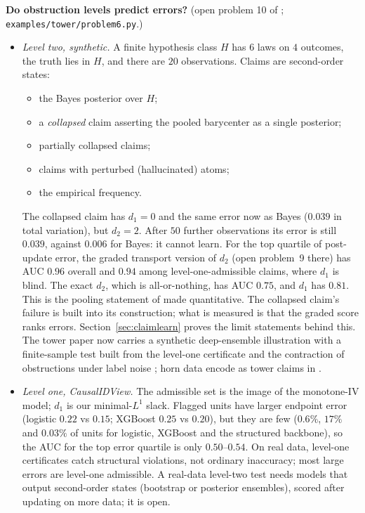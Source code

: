\documentclass[11pt]{article}
\theoremstyle{definition}
\theoremstyle{remark}
\begin{document}
\textbf{Do obstruction levels predict errors?} (open problem 10 of \cite{awasthiT}; \texttt{examples/tower/problem6.py}.)
\begin{itemize}
  \item \emph{Level two, synthetic.} A finite hypothesis class $H$ has $6$ laws on $4$ outcomes, the truth lies in $H$, and there are $20$ observations. Claims are second-order states:
  \begin{itemize}
    \item the Bayes posterior over $H$;
    \item a \emph{collapsed} claim asserting the pooled barycenter as a single posterior;
    \item partially collapsed claims;
    \item claims with perturbed (hallucinated) atoms;
    \item the empirical frequency.
  \end{itemize}
  The collapsed claim has $d_1=0$ and the same error now as Bayes ($0.039$ in total variation), but $d_2=2$. After $50$ further observations its error is still $0.039$, against $0.006$ for Bayes: it cannot learn. For the top quartile of post-update error, the graded transport version of $d_2$ (open problem~9 there) has AUC $0.96$ overall and $0.94$ among level-one-admissible claims, where $d_1$ is blind. The exact $d_2$, which is all-or-nothing, has AUC $0.75$, and $d_1$ has $0.81$. This is the pooling statement of \cite[Prop.~10.10]{awasthiT} made quantitative. The collapsed claim's failure is built into its construction; what is measured is that the graded score ranks errors. Section~\ref{sec:claimlearn} proves the limit statements behind this. The tower paper now carries a synthetic deep-ensemble illustration with a finite-sample test built from the level-one certificate and the contraction of obstructions under label noise \cite[\S11]{awasthiT}; horn data encode as tower claims in \cite[\S11]{awasthiC}.
  \item \emph{Level one, CausalIDView.} The admissible set is the image of the monotone-IV model; $d_1$ is our minimal-$L^1$ slack. Flagged units have larger endpoint error (logistic $0.22$ vs $0.15$; XGBoost $0.25$ vs $0.20$), but they are few ($0.6\%$, $17\%$ and $0.03\%$ of units for logistic, XGBoost and the structured backbone), so the AUC for the top error quartile is only $0.50$--$0.54$. On real data, level-one certificates catch structural violations, not ordinary inaccuracy; most large errors are level-one admissible. A real-data level-two test needs models that output second-order states (bootstrap or posterior ensembles), scored after updating on more data; it is open.
\end{itemize}
\end{document}
